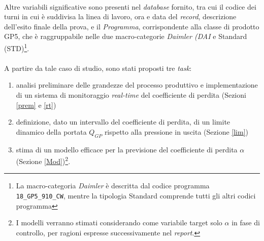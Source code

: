 \documentclass[fleqn,10pt]{SelfArx} %
\begin{document}
\\
Altre variabili significative sono presenti nel \textit{database} fornito, tra cui il codice dei turni in cui è suddivisa la linea di lavoro, ora e data del \textit{record}, descrizione dell'esito finale della prova, e il \textit{Programma}, corrispondente alla classe di prodotto GP5, che è raggruppabile nelle due macro-categorie \textit{Daimler (DAI} e Standard (STD)\footnote{La macro-categoria \textit{Daimler} è descritta dal codice programma \texttt{18\_GP5\_910\_CW}, mentre la tipologia Standard comprende tutti gli altri codici programma}.\\
\\
A partire da tale caso di studio, sono stati proposti tre \textit{task}:
\begin{enumerate}
    \item analisi preliminare delle grandezze del processo produttivo e implementazione di un sistema di monitoraggio \textit{real-time} del coefficiente di perdita (Sezioni \ref{prem} e \ref{rt})
    \item definizione, dato un intervallo del coefficiente di perdita, di un limite dinamico della portata $Q_{GP}$ rispetto alla pressione in uscita (Sezione \ref{lim})
    \item stima di un modello efficace per la previsione del coefficiente di perdita $\alpha$ (Sezione \ref{Mod})\footnote{I modelli verranno stimati considerando come variabile target solo $\alpha$ in fase di controllo, per ragioni espresse successivamente nel \textit{report}.}.
\end{enumerate}
\end{document}
